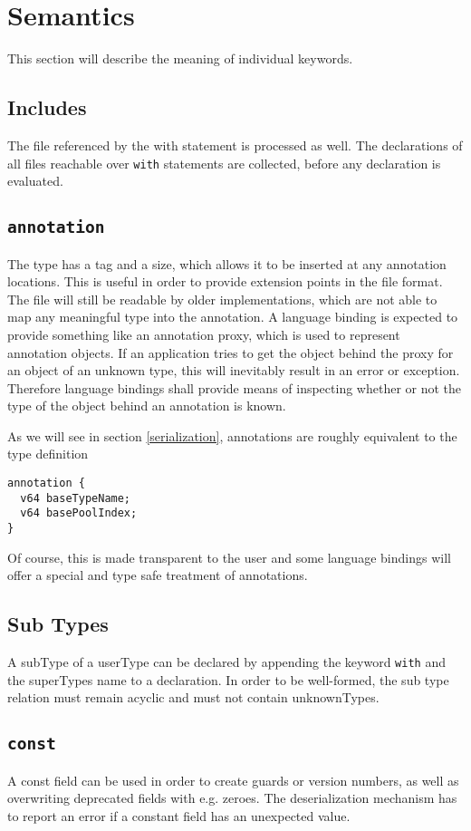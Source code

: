 \documentclass[a4paper,10pt]{article}
\begin{document}
\section{Semantics}

This section will describe the meaning of individual keywords.

\subsection{Includes}
The file referenced by the with statement is processed as well. The declarations of all files reachable over \texttt{with} statements are collected, before any declaration is evaluated.

\subsection{\texttt{annotation}}
The type has a tag and a size, which allows it to be inserted at any annotation locations. This is useful in order to provide extension points in the file format. The file will still be readable by older implementations, which are not able to map any meaningful type into the annotation. A language binding is expected to provide something like an annotation proxy, which is used to represent annotation objects. If an application tries to get the object behind the proxy for an object of an unknown type, this will inevitably result in an error or exception. Therefore language bindings shall provide means of inspecting whether or not the type of the object behind an annotation is known.

As we will see in section \ref{serialization}, annotations are roughly equivalent to the type definition
\begin{verbatim}
annotation {
  v64 baseTypeName;
  v64 basePoolIndex;
}
\end{verbatim}
Of course, this is made transparent to the user and some language bindings will offer a special and type safe treatment of annotations.

\subsection{Sub Types}
A \gls{subType} of a \gls{userType} can be declared by appending the keyword \texttt{with} and the \gls{superType}s name to a declaration. In order to be well-formed, the sub type relation must remain acyclic and must not contain \glspl{unknownType}.

\subsection{\texttt{const}}
A const field can be used in order to create guards or version numbers, as well as overwriting deprecated fields with e.g. zeroes. The deserialization mechanism has to report an error if a constant field has an unexpected value.
\end{document}
